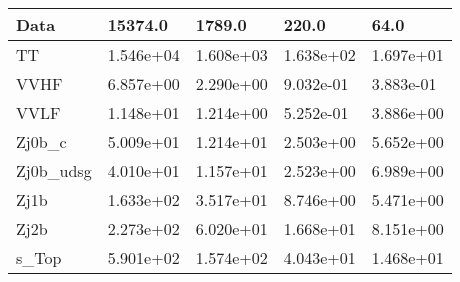 \begin{table}
{\begin{tabularx}{\textwidth}{|X|X|X|X|X|}
\hline
Data & 15374.0 & 1789.0 & 220.0 & 64.0 \\
\hline
TT & 1.546e+04 & 1.608e+03 & 1.638e+02 & 1.697e+01 \\
VVHF & 6.857e+00 & 2.290e+00 & 9.032e-01 & 3.883e-01 \\
VVLF & 1.148e+01 & 1.214e+00 & 5.252e-01 & 3.886e+00 \\
Zj0b\_c & 5.009e+01 & 1.214e+01 & 2.503e+00 & 5.652e+00 \\
Zj0b\_udsg & 4.010e+01 & 1.157e+01 & 2.523e+00 & 6.989e+00 \\
Zj1b & 1.633e+02 & 3.517e+01 & 8.746e+00 & 5.471e+00 \\
Zj2b & 2.273e+02 & 6.020e+01 & 1.668e+01 & 8.151e+00 \\
s\_Top & 5.901e+02 & 1.574e+02 & 4.043e+01 & 1.468e+01 \\
\hline
\end{tabularx}
}
\label{tab:cr-Zee-2017}
\end{table}

